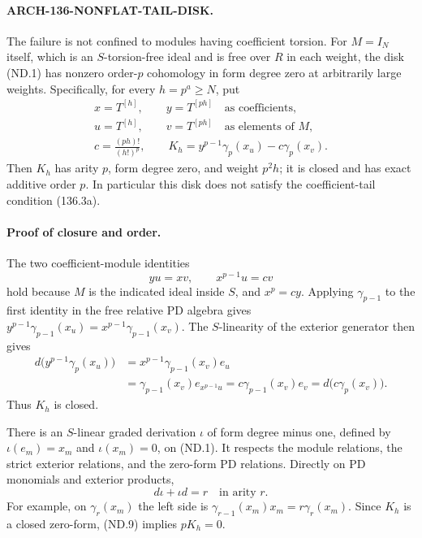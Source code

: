 \paragraph{ARCH-136-NONFLAT-TAIL-DISK.}
The failure is not confined to modules having coefficient torsion.
For \(M=I_N\) itself, which is an \(S\)-torsion-free ideal
and is free over \(R\) in each weight, the disk (ND.1) has
nonzero order-\(p\) cohomology in form degree zero at arbitrarily
large weights. Specifically, for every \(h=p^a\geq N\), put
\[
 \begin{gathered}
 x=T^{[h]},\qquad y=T^{[ph]}\quad\text{as coefficients},\\
 u=T^{[h]},\qquad v=T^{[ph]}\quad\text{as elements of }M,\\
 c=\frac{(ph)!}{(h!)^p},\qquad
 K_h=y^{p-1}\gamma_p(x_u)-c\gamma_p(x_v).
 \end{gathered}                                             \tag{ND.6}
\]
Then \(K_h\) has arity \(p\), form degree zero, and weight
\(p^2h\); it is closed and has exact additive order \(p\).
In particular this disk does not satisfy the coefficient-tail
condition (136.3a).

\paragraph{Proof of closure and order.}
The two coefficient-module identities
\[
                    yu=xv,\qquad x^{p-1}u=cv             \tag{ND.7}
\]
hold because \(M\) is the indicated ideal inside \(S\), and
\(x^p=cy\). Applying \(\gamma_{p-1}\) to the first identity
in the free relative PD algebra gives
\(y^{p-1}\gamma_{p-1}(x_u)
  =x^{p-1}\gamma_{p-1}(x_v)\).
The \(S\)-linearity of the exterior generator then gives
\[
 \begin{split}
 d\bigl(y^{p-1}\gamma_p(x_u)\bigr)
  &=x^{p-1}\gamma_{p-1}(x_v)e_u\\
  &=\gamma_{p-1}(x_v)e_{x^{p-1}u}
    =c\gamma_{p-1}(x_v)e_v
    =d\bigl(c\gamma_p(x_v)\bigr).
 \end{split}                                               \tag{ND.8}
\]
Thus \(K_h\) is closed.

There is an \(S\)-linear graded derivation \(\iota\) of form
degree minus one, defined by \(\iota(e_m)=x_m\) and
\(\iota(x_m)=0\), on (ND.1). It respects the module relations,
the strict exterior relations, and the zero-form PD relations.
Directly on PD monomials and exterior products,
\[
                   d\iota+\iota d=r
                 \quad\text{in arity }r.                 \tag{ND.9}
\]
For example, on \(\gamma_r(x_m)\) the left side is
\(\gamma_{r-1}(x_m)x_m=r\gamma_r(x_m)\).
Since \(K_h\) is a closed zero-form, (ND.9) implies \(pK_h=0\).

